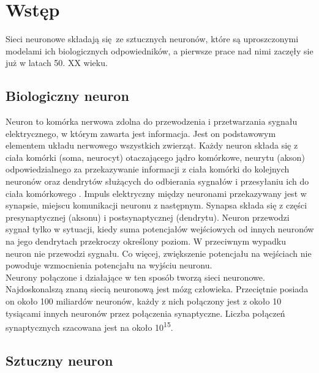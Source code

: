 
\chapter{Wstęp}

Sieci neuronowe składają się ze sztucznych neuronów, które są uproszczonymi modelami ich
biologicznych odpowiedników, a pierwsze prace nad nimi zaczęły sie już w latach 50.
XX wieku.

\section{Biologiczny neuron}

Neuron to komórka nerwowa zdolna do przewodzenia i przetwarzania sygnału
elektrycznego, w którym zawarta jest informacja. Jest on podstawowym elementem
układu nerwowego wszystkich zwierząt. Każdy neuron składa się z
ciała komórki (soma, neurocyt) otaczającego jądro komórkowe, neurytu (akson)
odpowiedzialnego za przekazywanie informacji z ciała komórki do kolejnych neuronów
oraz dendrytów służących do odbierania sygnałów i przesyłaniu ich do ciała
komórkowego \cite{CS231n, NNbiology}.
Impuls elektryczny między neuronami przekazywany jest
w synapsie, miejscu komunikacji neuronu z następnym. Synapsa składa się
z części presynaptycznej (aksonu) i postsynaptycznej (dendrytu). Neuron
przewodzi sygnał tylko w sytuacji, kiedy suma potencjałów wejściowych od innych
neuronów na jego dendrytach przekroczy określony poziom. W przeciwnym wypadku
neuron nie przewodzi sygnału. Co więcej, zwiększenie potencjału na wejściach
nie powoduje wzmocnienia potencjału na wyjściu neuronu.\\
Neurony połączone i działające w ten sposób tworzą sieci neuronowe. Najdoskonalszą
znaną siecią neuronową jest mózg człowieka. Przeciętnie posiada on około 100
miliardów neuronów, każdy z nich połączony jest z około 10 tysiącami innych
neuronów przez połączenia synaptyczne. Liczba połączeń synaptycznych szacowana
jest na około 10\textsuperscript{15}.

\section{Sztuczny neuron}

